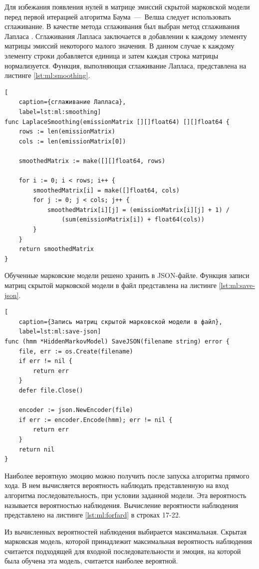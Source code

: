 Для избежания появления нулей в матрице эмиссий скрытой марковской модели перед первой итерацией алгоритма Баума~---~Велша следует использовать сглаживание. В качестве метода сглаживания был выбран метод сглаживания Лапласа \cite{smooting}.
%
Сглаживания Лапласа заключается в добавлении к каждому элементу матрицы эмиссий некоторого малого значения. В данном случае к каждому элементу строки добавляется единица и затем каждая строка матрицы нормализуется. Функция, выполняющая сглаживание Лапласа, представлена на листинге \ref{lst:ml:smoothing}.
\begin{lstlisting}[
	caption={сглаживание Лапласа},
	label=lst:ml:smoothing]
func LaplaceSmoothing(emissionMatrix [][]float64) [][]float64 {
	rows := len(emissionMatrix)
	cols := len(emissionMatrix[0])
	
	smoothedMatrix := make([][]float64, rows)
	
	for i := 0; i < rows; i++ {
		smoothedMatrix[i] = make([]float64, cols)
		for j := 0; j < cols; j++ {
			smoothedMatrix[i][j] = (emissionMatrix[i][j] + 1) /
				(sum(emissionMatrix[i]) + float64(cols))
		}
	}
	return smoothedMatrix
}
\end{lstlisting}
Обученные марковские модели решено хранить в JSON-файле. Функция записи матриц скрытой марковской модели в файл представлена на листинге \ref{lst:ml:save-json}.
\begin{lstlisting}[
	caption={Запись матриц скрытой марковской модели в файл},
	label=lst:ml:save-json]
func (hmm *HiddenMarkovModel) SaveJSON(filename string) error {
	file, err := os.Create(filename)
	if err != nil {
		return err
	}
	defer file.Close()
	
	encoder := json.NewEncoder(file)
	if err := encoder.Encode(hmm); err != nil {
		return err
	}
	return nil
}
\end{lstlisting}

Наиболее вероятную эмоцию можно получить после запуска алгоритма прямого хода. В нем вычисляется вероятность наблюдать представленную на вход алгоритма последовательность, при условии заданной модели. Эта вероятность называется вероятностью наблюдения. Вычисление вероятности наблюдения представлено на листинге \ref{lst:ml:forfard} в строках 17-22.

Из вычисленных вероятностей наблюдения выбирается максимальная. Скрытая марковская модель, которой принадлежит максимальная вероятность наблюдения считается подходящей для входной последовательности и эмоция, на которой была обучена эта модель, считается наиболее вероятной.

